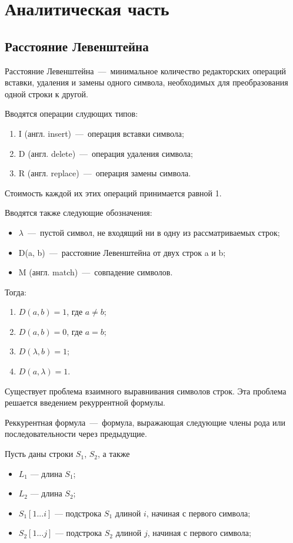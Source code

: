 \chapter{Аналитическая часть}
\section{Расстояние Левенштейна}
Расстояние Левенштейна~---~минимальное количество редакторских операций вставки, удаления и замены одного символа, необходимых для преобразования одной строки к другой.

Вводятся операции слудющих типов:
\begin{enumerate}
	\item I (англ. insert)~---~операция вставки символа;
	\item D (англ. delete)~---~операция удаления символа;
	\item R (англ. replace)~---~операция замены символа.
\end{enumerate}

Стоимость каждой их этих операций принимается равной 1.

Вводятся также следующие обозначения:
\begin{itemize}[label=---]
	\item $\lambda$~---~пустой символ, не входящий ни в одну из рассматриваемых строк;
	\item D(a, b)~---~расстояние Левенштейна от двух строк a и b;
	\item M (англ. match)~---~совпадение символов.
\end{itemize}

Тогда:
\begin{enumerate}
	\item $D(a, b) = 1$, где $a \neq b$;
	\item $D(a, b) = 0$, где $a = b$;
	\item $D(\lambda, b) = 1$;
	\item $D(a, \lambda) = 1$.
\end{enumerate}

Существует проблема взаимного выравнивания символов строк. Эта проблема решается введением рекуррентной формулы. 

Реккурентная формула~---~формула, выражающая следующие члены рода или последовательности через предыдущие.

Пусть даны строки $S_1$, $S_2$, а также
\begin{itemize}[label=---]
	\item $L_1$ --- длина $S_1$;
	\item $L_2$ --- длина $S_2$;
	\item $S_1[1...i]$ --- подстрока $S_1$ длиной $i$, начиная с первого символа;
	\item $S_2[1...j]$ --- подстрока $S_2$ длиной $j$, начиная с первого символа;
\end{itemize}

